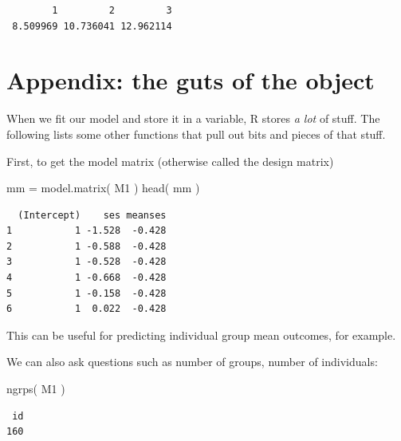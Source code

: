 \documentclass[
  letterpaper,
  DIV=11,
  numbers=noendperiod]{scrreprt}
\newenvironment{Shaded}{\begin{snugshade}}{\end{snugshade}}
\newcommand{\AttributeTok}[1]{\textcolor[rgb]{0.49,0.56,0.16}{#1}}
\newcommand{\DecValTok}[1]{\textcolor[rgb]{0.25,0.63,0.44}{#1}}
\newcommand{\FunctionTok}[1]{\textcolor[rgb]{0.02,0.16,0.49}{#1}}
\newcommand{\NormalTok}[1]{\textcolor[rgb]{0.00,0.44,0.13}{#1}}
\newcommand{\OtherTok}[1]{\textcolor[rgb]{0.00,0.44,0.13}{#1}}
\newcommand{\SpecialCharTok}[1]{\textcolor[rgb]{0.25,0.44,0.63}{#1}}
\begin{document}
\begin{Shaded}
\end{Shaded}

\begin{verbatim}
        1         2         3 
 8.509969 10.736041 12.962114 
\end{verbatim}

\hypertarget{appendix-the-guts-of-the-object}{%
\section{Appendix: the guts of the
object}\label{appendix-the-guts-of-the-object}}

When we fit our model and store it in a variable, R stores \emph{a lot}
of stuff. The following lists some other functions that pull out bits
and pieces of that stuff.

First, to get the model matrix (otherwise called the design matrix)

\begin{Shaded}
\begin{Highlighting}[]
\NormalTok{mm }\OtherTok{=} \FunctionTok{model.matrix}\NormalTok{( M1 )}
\FunctionTok{head}\NormalTok{( mm )}
\end{Highlighting}
\end{Shaded}

\begin{verbatim}
  (Intercept)    ses meanses
1           1 -1.528  -0.428
2           1 -0.588  -0.428
3           1 -0.528  -0.428
4           1 -0.668  -0.428
5           1 -0.158  -0.428
6           1  0.022  -0.428
\end{verbatim}

This can be useful for predicting individual group mean outcomes, for
example.

We can also ask questions such as number of groups, number of
individuals:

\begin{Shaded}
\begin{Highlighting}[]
\FunctionTok{ngrps}\NormalTok{( M1 )}
\end{Highlighting}
\end{Shaded}

\begin{verbatim}
 id 
160 
\end{verbatim}
\end{document}
